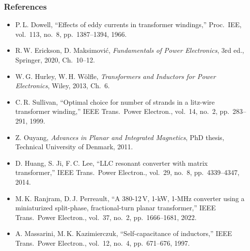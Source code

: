 \begin{frame}
	\frametitle{References}
	\scriptsize
	\begin{itemize}
		\item P.\,L. Dowell, ``Effects of eddy currents in transformer windings,'' Proc.\ IEE, vol.\ 113, no.\ 8, pp.\ 1387--1394, 1966.
		\item R.\,W. Erickson, D. Maksimovi\'c, \textit{Fundamentals of Power Electronics}, 3rd ed., Springer, 2020, Ch.\ 10--12.
		\item W.\,G. Hurley, W.\,H. W\"olfle, \textit{Transformers and Inductors for Power Electronics}, Wiley, 2013, Ch.\ 6.
		\item C.\,R. Sullivan, ``Optimal choice for number of strands in a litz-wire transformer winding,'' IEEE Trans.\ Power Electron., vol.\ 14, no.\ 2, pp.\ 283--291, 1999.
		\item Z. Ouyang, \textit{Advances in Planar and Integrated Magnetics}, PhD thesis, Technical University of Denmark, 2011.
		\item D. Huang, S. Ji, F.\,C. Lee, ``LLC resonant converter with matrix transformer,'' IEEE Trans.\ Power Electron., vol.\ 29, no.\ 8, pp.\ 4339--4347, 2014.
		\item M.\,K. Ranjram, D.\,J. Perreault, ``A 380-12\,V, 1-kW, 1-MHz converter using a miniaturized split-phase, fractional-turn planar transformer,'' IEEE Trans.\ Power Electron., vol.\ 37, no.\ 2, pp.\ 1666--1681, 2022.
		\item A. Massarini, M.\,K. Kazimierczuk, ``Self-capacitance of inductors,'' IEEE Trans.\ Power Electron., vol.\ 12, no.\ 4, pp.\ 671--676, 1997.
	\end{itemize}
\end{frame}

